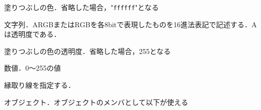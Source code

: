 \begin{description}
{\nopagebreak
\item[\texttt{Fill}] \mbox{}
    \vspace{-1zw}
    \begin{description}
    \setlength{\itemsep}{-1.5\itemsep}
    \item[説明] 塗りつぶしの色．省略した場合，"{\tt ffffff}"となる
    \item[値] 文字列．ARGBまたはRGBを各8bitで表現したものを16進法表記で記述する．Aは透明度である．
    \end{description}
}
\vspace{-1zw}
{\nopagebreak
\item[\texttt{Alpha}] \mbox{}
    \vspace{-1zw}
    \begin{description}
    \setlength{\itemsep}{-1.5\itemsep}
    \item[説明] 塗りつぶしの色の透明度．省略した場合，255となる
    \item[値] 数値．0～255の値
    \end{description}
}
\vspace{-1zw}
\item[\texttt{Pen}] \mbox{}
    \vspace{-1zw}
    \begin{description}
    \setlength{\itemsep}{-1.5\itemsep}
    \item[説明] 縁取り線を指定する．
    \item[値] オブジェクト．オブジェクトのメンバとして以下が使える
    

\end{description}
\end{description}
